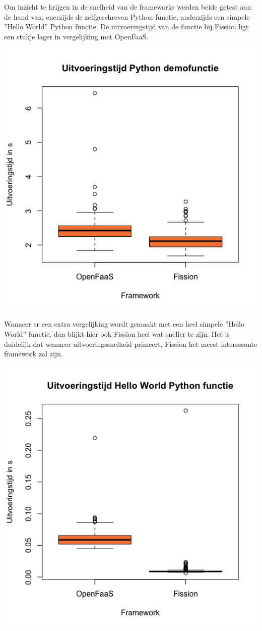 \documentclass[a0,portrait]{a0poster}
\begin{document}
\begin{multicols}{2}
Om inzicht te krijgen in de snelheid van de frameworks werden beide getest aan de hand van, enerzijds de zelfgeschreven Python functie, anderzijds een simpele ''Hello World'' Python functie. De uitvoeringstijd van de functie bij Fission ligt een stukje lager in vergelijking met OpenFaaS. 

\begin{center}\vspace{1cm}
\includegraphics[width=0.5\linewidth]{boxplot-uitvoeringstijd-demofunctie}
\end{center}\vspace{1cm}

 Wanneer er een extra vergelijking wordt gemaakt met een heel simpele ''Hello World'' functie, dan blijkt hier ook Fission heel wat sneller te zijn. Het is duidelijk dat wanneer uitvoeringssnelheid primeert, Fission het meest interessante framework zal zijn.
 
\begin{center}\vspace{1cm}
    \includegraphics[width=0.5\linewidth]{boxplot-uitvoeringstijd-hellofunctie}
\end{center}\vspace{1cm}



\end{multicols}
\end{document}
